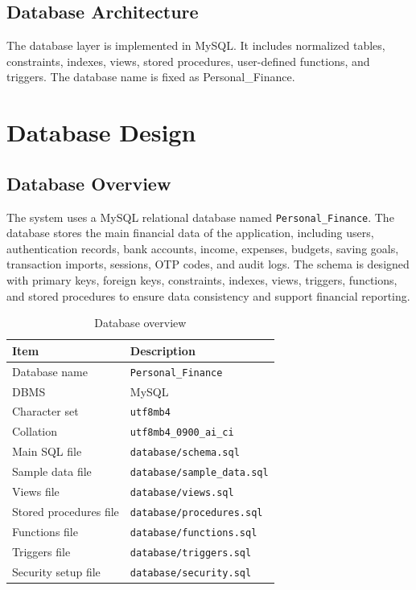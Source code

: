 \documentclass{article}
\newcommand{\dbname}{Personal\_Finance}
\begin{document}
\subsection{Database Architecture}
The database layer is implemented in MySQL. It includes normalized tables, constraints, indexes, views, stored procedures, user-defined functions, and triggers. The database name is fixed as \dbname.

\section{Database Design}

\subsection{Database Overview}

The system uses a MySQL relational database named \texttt{Personal\_Finance}.
The database stores the main financial data of the application, including users,
authentication records, bank accounts, income, expenses, budgets, saving goals,
transaction imports, sessions, OTP codes, and audit logs. The schema is designed
with primary keys, foreign keys, constraints, indexes, views, triggers, functions,
and stored procedures to ensure data consistency and support financial reporting.

\begin{table}[H]
\centering
\caption{Database overview}
\label{tab:database-overview}
\small
\renewcommand{\arraystretch}{1.15}
\begin{tabular}{ll}
\toprule
\textbf{Item} & \textbf{Description} \\
\midrule
Database name       & \texttt{Personal\_Finance} \\
DBMS                & MySQL \\
Character set       & \texttt{utf8mb4} \\
Collation           & \texttt{utf8mb4\_0900\_ai\_ci} \\
Main SQL file       & \texttt{database/schema.sql} \\
Sample data file    & \texttt{database/sample\_data.sql} \\
Views file          & \texttt{database/views.sql} \\
Stored procedures file & \texttt{database/procedures.sql} \\
Functions file      & \texttt{database/functions.sql} \\
Triggers file       & \texttt{database/triggers.sql} \\
Security setup file & \texttt{database/security.sql} \\
\bottomrule
\end{tabular}
\end{table}
\end{document}
